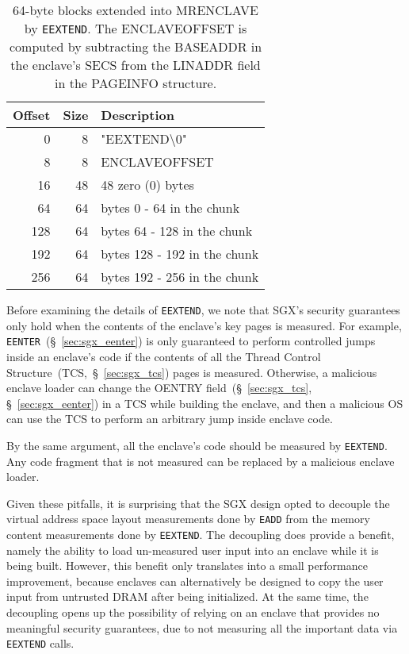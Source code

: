 \begin{table}[hbt]
  \centering
  \begin{tabularx}{\columnwidth}{| r | r | X |}
  \hline
  \textbf{Offset} & \textbf{Size} & \textbf{Description}\\
  \hline
  0 & 8 & "EEXTEND\textbackslash{}0" \\
  \hline
  8 & 8 & ENCLAVEOFFSET \\
  \hline
  16 & 48 & 48 zero (0) bytes \\
  \hline
  \hline
  64 & 64 & bytes 0 - 64 in the chunk \\
  \hline
  \hline
  128 & 64 & bytes 64 - 128 in the chunk \\
  \hline
  \hline
  192 & 64 & bytes 128 - 192 in the chunk \\
  \hline
  \hline
  256 & 64 & bytes 192 - 256 in the chunk \\
  \hline
  \end{tabularx}
  \caption{
    64-byte blocks extended into MRENCLAVE by \texttt{EEXTEND}. The
    ENCLAVEOFFSET is computed by subtracting the BASEADDR in the enclave's SECS
    from the LINADDR field in the PAGEINFO structure.
  }
  \label{fig:eextend_mrenclave}
\end{table}

Before examining the details of \texttt{EEXTEND}, we note that SGX's security
guarantees only hold when the contents of the enclave's key pages is measured.
For example, \texttt{EENTER}~(\S~\ref{sec:sgx_eenter}) is only guaranteed to
perform controlled jumps inside an enclave's code if the contents of all the
Thread Control Structure~(TCS,~\S~\ref{sec:sgx_tcs}) pages is measured.
Otherwise, a malicious enclave loader can change the OENTRY
field~(\S~\ref{sec:sgx_tcs}, \S~\ref{sec:sgx_eenter}) in a TCS while building
the enclave, and then a malicious OS can use the TCS to perform an arbitrary
jump inside enclave code.

By the same argument, all the enclave's code should be measured by
\texttt{EEXTEND}. Any code fragment that is not measured can be replaced by a
malicious enclave loader.

Given these pitfalls, it is surprising that the SGX design opted to decouple
the virtual address space layout measurements done by \texttt{EADD} from the
memory content measurements done by \texttt{EEXTEND}. The decoupling does
provide a benefit, namely the ability to load un-measured user input into an
enclave while it is being built. However, this benefit only translates into a
small performance improvement, because enclaves can alternatively be designed
to copy the user input from untrusted DRAM after being initialized. At the same
time, the decoupling opens up the possibility of relying on an enclave that
provides no meaningful security guarantees, due to not measuring all the
important data via \texttt{EEXTEND} calls.

